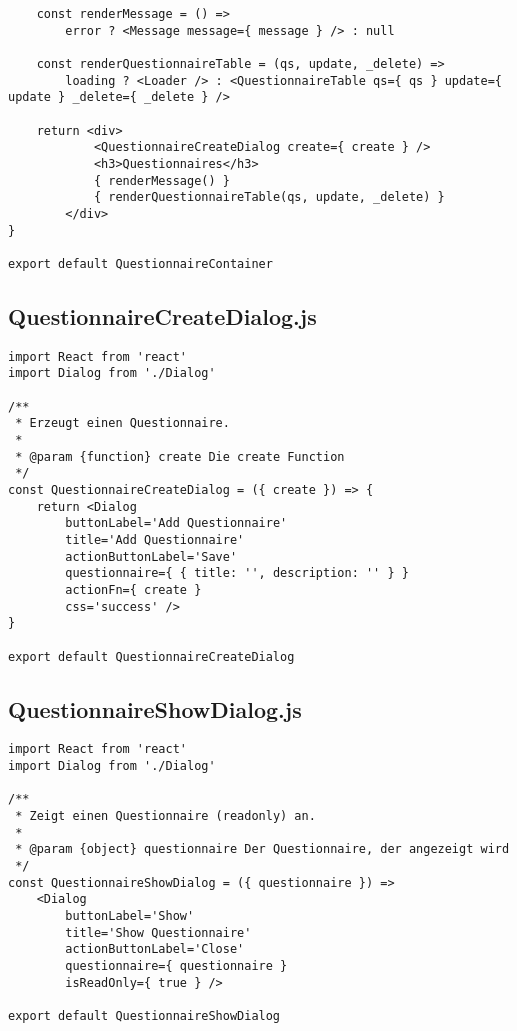 \begin{verbatim}
    const renderMessage = () => 
        error ? <Message message={ message } /> : null

    const renderQuestionnaireTable = (qs, update, _delete) => 
        loading ? <Loader /> : <QuestionnaireTable qs={ qs } update={ update } _delete={ _delete } />

    return <div>
            <QuestionnaireCreateDialog create={ create } />
            <h3>Questionnaires</h3>
            { renderMessage() }
            { renderQuestionnaireTable(qs, update, _delete) }
        </div>
}

export default QuestionnaireContainer
\end{verbatim}

\subsection{QuestionnaireCreateDialog.js}
\begin{verbatim}
import React from 'react'
import Dialog from './Dialog'

/**
 * Erzeugt einen Questionnaire.
 * 
 * @param {function} create Die create Function
 */
const QuestionnaireCreateDialog = ({ create }) => {
    return <Dialog 
        buttonLabel='Add Questionnaire' 
        title='Add Questionnaire' 
        actionButtonLabel='Save'
        questionnaire={ { title: '', description: '' } }
        actionFn={ create } 
        css='success' />
}

export default QuestionnaireCreateDialog
\end{verbatim}


\subsection{QuestionnaireShowDialog.js}
\begin{verbatim}
import React from 'react'
import Dialog from './Dialog'

/**
 * Zeigt einen Questionnaire (readonly) an.
 * 
 * @param {object} questionnaire Der Questionnaire, der angezeigt wird
 */
const QuestionnaireShowDialog = ({ questionnaire }) => 
    <Dialog 
        buttonLabel='Show' 
        title='Show Questionnaire' 
        actionButtonLabel='Close' 
        questionnaire={ questionnaire }  
        isReadOnly={ true } />

export default QuestionnaireShowDialog
\end{verbatim}


